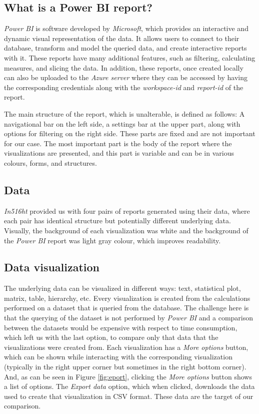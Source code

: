 \documentclass[fleqn,moreauthors,10pt]{ds_report}
\begin{document}
\subsection*{What is a Power BI report?}
\textit{Power BI} is software developed by \textit{Microsoft}, which provides an interactive and dynamic visual representation of the data. It allows users to connect to their database, transform and model the queried data, and create interactive reports with it. These reports have many additional features, such as filtering, calculating measures, and slicing the data. In addition, these reports,  once created locally can also be uploaded to the \textit{Azure server} where they can be accessed by having the corresponding credentials along with the \textit{workspace-id} and \textit{report-id} of the report. 
\par
The main structure of the report, which is unalterable, is defined as follows: A navigational bar on the left side, a settings bar at the upper part, along with options for filtering on the right side. These parts are fixed and are not important for our case. The most important part is the body of the report where the visualizations are presented, and this part is variable and can be in various colours, forms, and structures.

\subsection*{Data}
\textit{In516ht} 
provided us with four pairs of reports generated using their data, where each pair has identical structure but potentially different underlying data. Visually, the background of each visualization was  white and the background of the \textit{Power BI} report was light gray colour, which improves readability.
\subsection*{Data visualization}
The underlying data can be visualized in different ways: text, statistical plot, matrix, table, hierarchy, etc. Every visualization is created from the calculations performed on a dataset that is queried from the database. The challenge here is that the querying of the dataset is not performed by \textit{Power BI} and a comparison between the datasets would be expensive with respect to time consumption, which left us with the last option, to compare only that data that the visualizations were created from. Each visualization has a \textit{More options} button, which can be shown while interacting with the corresponding visualization (typically in the right upper corner but sometimes in the right bottom corner). And, as can be seen in Figure \ref{fig:eport}, clicking the \textit{More options} button shows a list of options. The \textit{Export data} option, which when clicked, downloads the data used to create that visualization in CSV format. These data are the target of our comparison.
\end{document}
